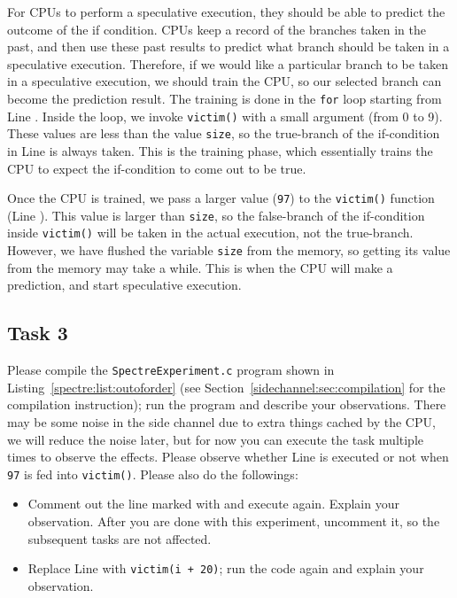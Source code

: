 For CPUs to perform a speculative execution, they should be able to
predict the outcome of the if condition.  CPUs keep a record of the branches taken in the past,
and then use these past results to predict what branch should be taken in a 
speculative execution. 
Therefore, if we would like a particular branch to be taken in 
a speculative execution, we should train the CPU, so our selected branch 
can become the prediction result. The training is done 
in the \texttt{for} loop starting from Line . 
Inside the loop, we invoke \texttt{victim()} with a small argument (from 0 to 9). These values are
less than the value \texttt{size}, so the true-branch of the if-condition in Line  is
always taken. This is the training phase, which essentially trains the CPU to expect the 
if-condition to come out to be true. 


Once the CPU is trained, we pass a larger value (\texttt{97})
to the \texttt{victim()} function (Line ). This value is larger than \texttt{size},
so the false-branch of the if-condition inside \texttt{victim()} will be taken in
the actual execution, not the true-branch. However, we have flushed the variable \texttt{size}
from the memory, so getting its value from the memory may take a while. This is when the CPU
will make a prediction, and start speculative execution. 



\subsection{Task 3} 


Please compile the \texttt{SpectreExperiment.c} program 
shown in Listing~\ref{spectre:list:outoforder} (see Section~\ref{sidechannel:sec:compilation}
for the compilation instruction); 
run the program and describe your observations. 
There may be some noise in the side channel due to extra things cached by the
CPU, we will reduce the noise later, but for now you can execute the task multiple times to
observe the effects. Please observe whether Line  is executed 
or not when \texttt{97} is fed into \texttt{victim()}.  
Please also do the followings:

\begin{itemize}
\item Comment out the line marked with  and execute again. Explain your
observation. After you are done with this experiment, 
uncomment it, so the subsequent tasks are not affected.

\item Replace Line  with \texttt{victim(i + 20)}; run the code again and
explain your observation. 
\end{itemize}
 



